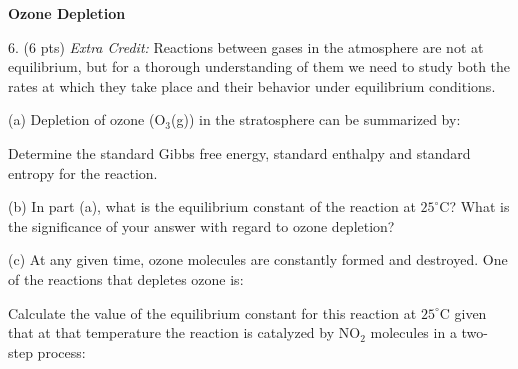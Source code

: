 \documentclass[11pt]{article}
\begin{document}

\pagebreak

\textbf{Ozone Depletion}

6. (6 pts) \textit{Extra Credit:} Reactions between gases in the atmosphere are not at equilibrium,
but for a thorough understanding of them we need to study both the rates at which they take
place and their behavior under equilibrium conditions.

(a) Depletion of ozone (O$_3$(g)) in the stratosphere can be summarized by:
\begin{center}
\end{center}
Determine the standard Gibbs free energy, standard enthalpy and standard entropy for the
reaction.

(b) In part (a), what is the equilibrium constant of the reaction at $25^\circ\text{C}$?
What is the significance of your answer with regard to ozone depletion?

(c) At any given time, ozone molecules are constantly formed and destroyed. One
of the reactions that depletes ozone is:
\begin{center}
\end{center}
Calculate the value of the equilibrium constant for this reaction at $25^\circ\text{C}$
given that at that temperature the reaction is catalyzed by NO$_2$ molecules in a two-step
process:
\begin{center}
   \\
\end{center}
\end{document}
